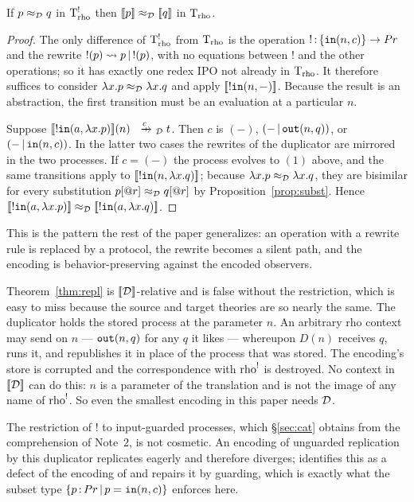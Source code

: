 \documentclass{article}
\begin{document}
\begin{theorem}
\label{thm:repl}
    If $p\approx_{\mathcal{D}} q$ in $\mathrm{T}_{\mathrm{rho}}^{!}$ then $[\![p]\!]\approx_{\mathcal{D}} [\![q]\!]$ in $\mathrm{T}_{\mathrm{rho}}$.
\end{theorem}
\begin{proof}
    The only difference of $\mathrm{T}_{\mathrm{rho}}^{!}$ from $\mathrm{T}_{\mathrm{rho}}$ is the operation $!\,{:}\, \{\mathtt{in}(n,c)\}\to Pr$ and the rewrite $!(p)\rightsquigarrow p\,|\, !(p)$, with no equations between $!$ and the other operations; so it has exactly one redex IPO not already in $\mathrm{T}_{\mathrm{rho}}$. It therefore suffices to consider $\lambda x.p\approx_{\mathcal{D}} \lambda x.q$ and apply $[\![!\mathtt{in}(n,-)]\!]$. Because the result is an abstraction, the first transition must be an evaluation at a particular $n$.

    Suppose $\map{!\mtt{in}(a,\lambda x.p)}(n)\xr{c}_\D t$. Then $c$ is $(-)$, $(-\,|\, \mathtt{out}(n,q))$, or $(-\,|\, \mathtt{in}(n,c))$. In the latter two cases the rewrites of the duplicator are mirrored in the two processes. If $c=(-)$ the process evolves to $(1)$ above, and the same transitions apply to $[\![!\mathtt{in}(n,\lambda x. q)]\!]$; because $\lambda x.p\approx_{\mathcal{D}} \lambda x.q$, they are bisimilar for every substitution $p[@r]\approx_{\mathcal{D}} q[@r]$ by Proposition~\ref{prop:subst}. Hence $[\![!\mathtt{in}(a,\lambda x.p)]\!]\approx_{\mathcal{D}} [\![!\mathtt{in}(a,\lambda x.q)]\!]$.
\end{proof}

This is the pattern the rest of the paper generalizes: an operation with a rewrite rule is replaced by a protocol, the rewrite becomes a silent path, and the encoding is behavior-preserving against the encoded observers.

\begin{remark}
\label{rem:replrestrict}
    Theorem~\ref{thm:repl} is $[\![\mathcal{D}]\!]$-relative and is false without the restriction, which is easy to miss because the source and target theories are so nearly the same. The duplicator holds the stored process at the parameter $n$. An arbitrary rho context may send on $n$ --- $\mathtt{out}(n,q)$ for any $q$ it likes --- whereupon $D(n)$ receives $q$, runs it, and republishes it in place of the process that was stored. The encoding's store is corrupted and the correspondence with $\mathrm{rho}^{!}$ is destroyed. No context in $[\![\mathcal{D}]\!]$ can do this: $n$ is a parameter of the translation and is not the image of any name of $\mathrm{rho}^{!}$. So even the smallest encoding in this paper needs $\mathcal{D}$.
\end{remark}

\begin{remark}
\label{rem:guard}
    The restriction of $!$ to input-guarded processes, which \S\ref{sec:cat} obtains from the comprehension of Note~2, is not cosmetic. An encoding of unguarded replication by this duplicator replicates eagerly and therefore diverges; \citet{lybech} identifies this as a defect of the encoding of \citet{rho} and repairs it by guarding, which is exactly what the subset type $\{p\,{:}\, Pr\,|\, p=\mathtt{in}(n,c)\}$ enforces here.
\end{remark}
\end{document}
